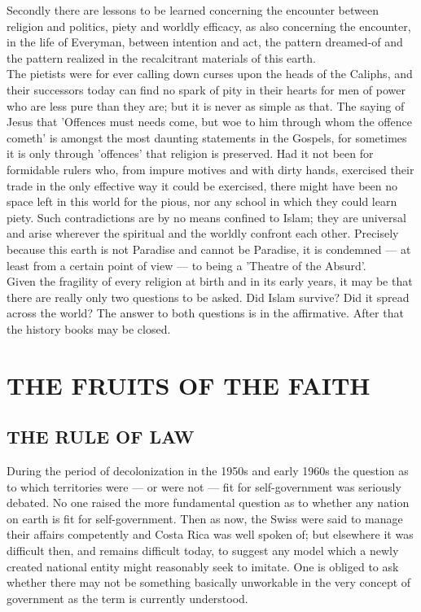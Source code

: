 \documentclass[10pt, twoside,openright]{book}
\begin{document}
Secondly there are lessons to be learned concerning the encounter between religion and politics, 
piety and worldly efficacy, as also concerning the encounter, in the life of Everyman, between 
intention and act, the pattern dreamed\hyp{}of and the pattern realized in the recalcitrant materials of 
this earth. \\

The pietists were for ever calling down curses upon the heads of the Caliphs, and their successors 
today can find no spark of pity in their hearts for men of power who are less pure than they are; but 
it is never as simple as that. The saying of Jesus that 'Offences must needs come, but woe to him 
through whom the offence cometh' is amongst the most daunting statements in the Gospels, for 
sometimes it is only through 'offences' that religion is preserved. Had it not been for formidable 
rulers who, from impure motives and with dirty hands, exercised their trade in the only effective way 
it could be exercised, there might have been no space left in this world for the pious, nor any 
school in which they could learn piety. Such contradictions are by no means confined to Islam; they 
are universal and arise wherever the spiritual and the worldly confront each other. Precisely because 
this earth is not Paradise and cannot be Paradise, it is condemned --- at least from a certain point of 
view --- to being a 'Theatre of the Absurd'. \\

Given the fragility of every religion at birth and in its early years, it may be that there are 
really only two questions to be asked. Did Islam survive? Did it spread across the world? The answer 
to both questions is in the affirmative. After that the history books may be closed. \\


\part{THE FRUITS OF THE FAITH}
\chapter{THE RULE OF LAW}

During the period of decolonization in the 1950s and early 1960s the question as to which territories 
were --- or were not --- fit for self-government was seriously debated. No one raised the more 
fundamental question as to whether any nation on earth is fit for self\hyp{}government. Then as now, the 
Swiss were said to manage their affairs competently and Costa Rica was well spoken of; but elsewhere 
it was difficult then, and remains difficult today, to suggest any model which a newly created 
national entity might reasonably seek to imitate. One is obliged to ask whether there may not be 
something basically unworkable in the very concept of government as the term is currently understood. \\
\end{document}
